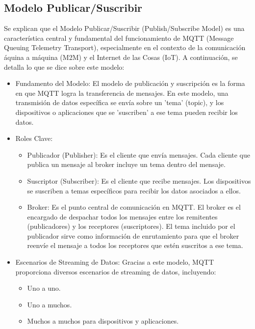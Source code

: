 \documentclass{report}
\begin{document}
\subsection{Modelo Publicar/Suscribir}
Se  explican que el Modelo Publicar/Suscribir (Publish/Subscribe Model) es una característica central y 
fundamental del funcionamiento de MQTT (Message Queuing Telemetry Transport), especialmente en el contexto de la comunicación 
áquina a máquina (M2M) y el Internet de las Cosas (IoT).
A continuación, se detalla lo que se  dice sobre este modelo:
\begin{itemize}
    \item Fundamento del Modelo: El modelo de publicación y suscripción es la forma en que MQTT logra la transferencia de mensajes. 
    En este modelo, una transmisión de datos específica se envía sobre un 'tema' (topic), y los dispositivos o aplicaciones que se 'suscriben' 
    a ese tema pueden recibir los datos.
    \item Roles Clave:
        \begin{itemize}
            \item Publicador (Publisher): Es el cliente que envía mensajes. Cada cliente que publica un mensaje al broker incluye un 
            tema dentro del mensaje.
            \item Suscriptor (Subscriber): Es el cliente que recibe mensajes. Los dispositivos se suscriben a temas específicos 
            para recibir los datos asociados a ellos.
            \item Broker: Es el punto central de comunicación en MQTT. El broker es el encargado de despachar todos los 
            mensajes entre los remitentes (publicadores) y los receptores (suscriptores). El tema incluido por el publicador 
            sirve como información de enrutamiento para que el broker reenvíe el mensaje a todos los receptores que estén 
            suscritos a ese tema.
        \end{itemize}
    \item Escenarios de Streaming de Datos: Gracias a este modelo, MQTT proporciona diversos escenarios de streaming de datos, incluyendo:
        \begin{itemize}
            \item Uno a uno.
            \item Uno a muchos.
            \item Muchos a muchos para dispositivos y aplicaciones.        
        \end{itemize}

\end{itemize}
\end{document}
